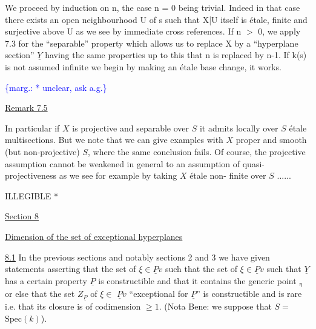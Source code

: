 \documentclass[11pt]{article}
\newcommand{\scanpage}[1]{\par\bigskip\noindent{\small\sffamily[scan #1]}\par}
\newcommand{\mspage}[1]{{\small\sffamily[p.\,#1]}}
\newcommand{\margin}[1]{\textcolor{blue}{\{\textsf{marg.:} #1\}}}
\newcommand{\uline}[1]{\underline{#1}}
\begin{document}
We proceed by induction on n, the case n = 0 being trivial.
Indeed in that case there exists an open neighbourhood U of s such
that X|U itself is \'etale, finite and surjective above U as we see
by immediate cross references.  If n $>$ 0, we apply 7.3 for the
``separable'' property which allows us to replace X by a ``hyperplane
section'' $\underline{Y}$ having the same properties up to this that n is
replaced by n-1.  If k(s) is not assumed infinite we begin by
making an \'etale base change, it works.

\margin{* unclear, ask a.g.}

\clearpage
\scanpage{24/35}
\mspage{35}

\uline{Remark 7.5}

In particular if $X$ is projective and separable over $S$ it
admits locally over $S$ étale multisections.  But we note that we
can give examples with $X$ proper and smooth (but non-projective) $S$,
where the same conclusion fails.  Of course, the projective
assumption cannot be weakened in general to an assumption of
quasi-projectiveness as we see for example by taking $X$ étale non-%
finite over $S$ ......

ILLEGIBLE *

\clearpage
\scanpage{24/36}
\mspage{36}

\uline{Section 8}

\uline{Dimension of the set of exceptional hyperplanes}

\uline{8.1} In the previous sections and notably sections 2 and 3 we have
given statements asserting that the set of $\xi \in \underline{P}v$ such that the set
of $\xi \in \underline{P}v$ such that $\underline{Y}$ has a certain property $\underline{P}$ is constructible and
that it contains the generic point ${}_{\eta}$ or else that the set $Z_{\underline{P}}$ of $\xi \in$
$\underline{P}v$ ``exceptional for $\underline{P}$'' is constructible and is rare i.e. that its
closure is of codimension $\geq 1$.  (Nota Bene:  we suppose that $S =$
$\mathrm{Spec}(k)$).
\end{document}
